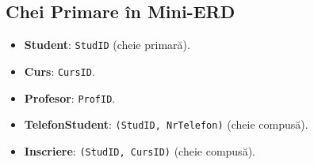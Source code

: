 \documentclass[12pt,a4paper]{article}
\begin{document}
\subsection*{Chei Primare în Mini-ERD}
\begin{itemize}[noitemsep]
    \item \textbf{Student}: \texttt{StudID} (cheie primară).
    \item \textbf{Curs}: \texttt{CursID}.
    \item \textbf{Profesor}: \texttt{ProfID}.
    \item \textbf{TelefonStudent}: \texttt{(StudID, NrTelefon)} (cheie compusă).
    \item \textbf{Inscriere}: \texttt{(StudID, CursID)} (cheie compusă).
\end{itemize}
\end{document}
